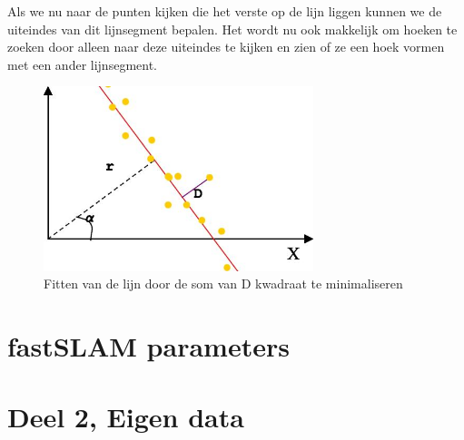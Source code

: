 \documentclass[a4paper]{article}
\begin{document}
Als we nu naar de punten kijken die het verste op de lijn liggen kunnen we de uiteindes van dit lijnsegment bepalen. Het wordt nu ook makkelijk om hoeken te zoeken door alleen naar deze uiteindes te kijken en zien of ze een hoek vormen met een ander lijnsegment. 

\begin{figure}[h]
	\centering
	\includegraphics[width=0.7\textwidth]{img/stolenline.png}
	\caption{Fitten van de lijn door de som van D kwadraat te minimaliseren}
	\label{fig:linefit}
\end{figure}

\section{fastSLAM parameters}
\section{Deel 2, Eigen data}
\end{document}
